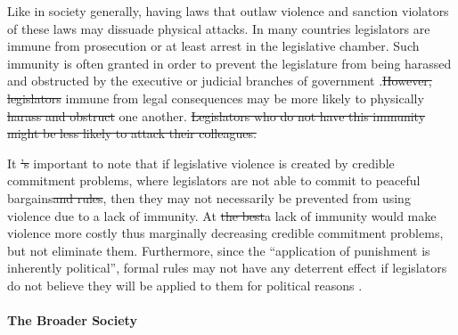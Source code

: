 \documentclass[a4paper]{article}\usepackage[]{graphicx}\usepackage[]{color}
\providecommand{\DIFaddtex}[1]{{\protect\color{blue}\uwave{#1}}} %
\providecommand{\DIFdeltex}[1]{{\protect\color{red}\sout{#1}}}                      %
\providecommand{\DIFaddbegin}{} %
\providecommand{\DIFaddend}{} %
\providecommand{\DIFdelbegin}{} %
\providecommand{\DIFdelend}{} %
\providecommand{\DIFadd}[1]{\texorpdfstring{\DIFaddtex{#1}}{#1}} %
\providecommand{\DIFdel}[1]{\texorpdfstring{\DIFdeltex{#1}}{}} %
\begin{document}
Like in society generally, having laws that outlaw violence and sanction violators of these laws may dissuade physical attacks. In many countries legislators are immune from prosecution or at least arrest in the legislative chamber. Such immunity is often granted in order to prevent the legislature from being harassed and obstructed by the executive or judicial branches of government  \citep{Seghetti1984}.\DIFdelbegin \DIFdel{However, legislators }\DIFdelend \DIFaddbegin \DIFadd{Legislators }\DIFaddend immune from legal consequences may be more likely to physically \DIFdelbegin \DIFdel{harass and obstruct }\DIFdelend \DIFaddbegin \DIFadd{attach }\DIFaddend one another.
\DIFdelbegin \DIFdel{Legislators who do not have this immunity might be less likely to attack their colleagues.
}\DIFdelend 

It \DIFdelbegin \DIFdel{'s }\DIFdelend \DIFaddbegin \DIFadd{is }\DIFaddend important to note that if legislative violence is created by credible commitment problems, where legislators are not able to commit to peaceful bargains\DIFdelbegin \DIFdel{and rules}\DIFdelend , then they may not necessarily be prevented from using violence due to a lack of immunity. At \DIFdelbegin \DIFdel{the best}\DIFdelend \DIFaddbegin \DIFadd{best, }\DIFaddend a lack of immunity would make violence more costly thus marginally decreasing credible commitment problems, but not eliminate them. Furthermore, since the ``application of punishment is inherently political'', formal rules may not have any deterrent effect if legislators do not believe they will be applied to them for political reasons \cite[58]{Wolfe2004}.

\paragraph{The Broader Society}
\end{document}
